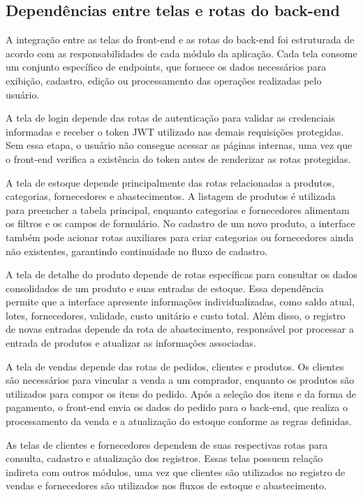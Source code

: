 \subsection{Dependências entre telas e rotas do back-end}

A integração entre as telas do front-end e as rotas do back-end foi estruturada de acordo com as responsabilidades de cada módulo da aplicação. Cada tela consome um conjunto específico de endpoints, que fornece os dados necessários para exibição, cadastro, edição ou processamento das operações realizadas pelo usuário.

A tela de login depende das rotas de autenticação para validar as credenciais informadas e receber o token JWT utilizado nas demais requisições protegidas. Sem essa etapa, o usuário não consegue acessar as páginas internas, uma vez que o front-end verifica a existência do token antes de renderizar as rotas protegidas.

A tela de estoque depende principalmente das rotas relacionadas a produtos, categorias, fornecedores e abastecimentos. A listagem de produtos é utilizada para preencher a tabela principal, enquanto categorias e fornecedores alimentam os filtros e os campos de formulário. No cadastro de um novo produto, a interface também pode acionar rotas auxiliares para criar categorias ou fornecedores ainda não existentes, garantindo continuidade no fluxo de cadastro.

A tela de detalhe do produto depende de rotas específicas para consultar os dados consolidados de um produto e suas entradas de estoque. Essa dependência permite que a interface apresente informações individualizadas, como saldo atual, lotes, fornecedores, validade, custo unitário e custo total. Além disso, o registro de novas entradas depende da rota de abastecimento, responsável por processar a entrada de produtos e atualizar as informações associadas.

A tela de vendas depende das rotas de pedidos, clientes e produtos. Os clientes são necessários para vincular a venda a um comprador, enquanto os produtos são utilizados para compor os itens do pedido. Após a seleção dos itens e da forma de pagamento, o front-end envia os dados do pedido para o back-end, que realiza o processamento da venda e a atualização do estoque conforme as regras definidas.

As telas de clientes e fornecedores dependem de suas respectivas rotas para consulta, cadastro e atualização dos registros. Essas telas possuem relação indireta com outros módulos, uma vez que clientes são utilizados no registro de vendas e fornecedores são utilizados nos fluxos de estoque e abastecimento.

